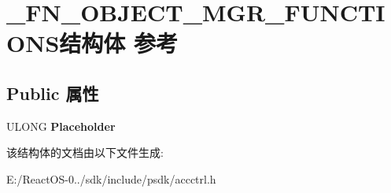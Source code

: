 \hypertarget{struct___f_n___o_b_j_e_c_t___m_g_r___f_u_n_c_t_i_o_n_s}{}\section{\+\_\+\+F\+N\+\_\+\+O\+B\+J\+E\+C\+T\+\_\+\+M\+G\+R\+\_\+\+F\+U\+N\+C\+T\+I\+O\+N\+S结构体 参考}
\label{struct___f_n___o_b_j_e_c_t___m_g_r___f_u_n_c_t_i_o_n_s}
\subsection*{Public 属性}
\begin{DoxyCompactItemize}
\item 
\mbox{\label{struct___f_n___o_b_j_e_c_t___m_g_r___f_u_n_c_t_i_o_n_s_a68b337b89f561d6846aa082c2237342c}} 
U\+L\+O\+NG {\bfseries Placeholder}
\end{DoxyCompactItemize}


该结构体的文档由以下文件生成\+:\begin{DoxyCompactItemize}
\item 
E\+:/\+React\+O\+S-\/0../sdk/include/psdk/accctrl.\+h\end{DoxyCompactItemize}
